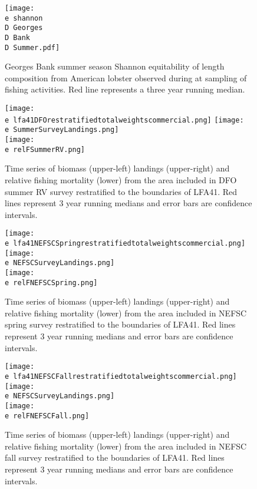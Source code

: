 \documentclass[11pt]{article}
\newcommand{\D}{.}
\newcommand{\e}{/backup/bio_data/bio.lobster/figures/} %
\begin{document}
\begin{figure}

    \texttt{[image: \\e shannon\\D Georges\\D Bank\\D Summer.pdf]}
    \caption{Georges Bank summer season Shannon equitability of length composition from American lobster observed during at sampling of fishing activities. Red line represents a three year running median.}

\end{figure}


\clearpage





\begin{figure}
\centering
    \texttt{[image: \\e lfa41DFOrestratifiedtotalweightscommercial.png]}
    \texttt{[image: \\e SummerSurveyLandings.png]} \\
    \texttt{[image: \\e relFSummerRV.png]} \\
    \caption{Time series of biomass (upper-left) landings (upper-right) and relative fishing mortality (lower) from the area included in DFO summer RV survey restratified to the boundaries of LFA41. Red lines represent 3 year running medians and error bars are confidence intervals.}

\end{figure}


\begin{figure}
\centering
    \texttt{[image: \\e lfa41NEFSCSpringrestratifiedtotalweightscommercial.png]}
    \texttt{[image: \\e NEFSCSurveyLandings.png]} \\
    \texttt{[image: \\e relFNEFSCSpring.png]} \\
    \caption{Time series of biomass (upper-left) landings (upper-right) and relative fishing mortality (lower) from the area included in NEFSC spring survey restratified to the boundaries of LFA41. Red lines represent 3 year running medians and error bars are confidence intervals.}

\end{figure}


\begin{figure}
\centering
    \texttt{[image: \\e lfa41NEFSCFallrestratifiedtotalweightscommercial.png]}
    \texttt{[image: \\e NEFSCSurveyLandings.png]} \\
    \texttt{[image: \\e relFNEFSCFall.png]} \\
    \caption{Time series of biomass (upper-left) landings (upper-right) and relative fishing mortality (lower) from the area included in NEFSC fall survey restratified to the boundaries of LFA41. Red lines represent 3 year running medians and error bars are confidence intervals.}

\end{figure}
\end{document}
